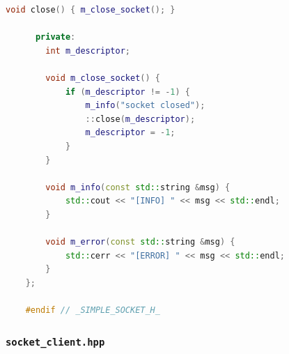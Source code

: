 \documentclass{article}
\begin{document}
\begin{lstlisting}[language=C++]
        void close() { m_close_socket(); }
    
      private:
        int m_descriptor;
    
        void m_close_socket() {
            if (m_descriptor != -1) {
                m_info("socket closed");
                ::close(m_descriptor);
                m_descriptor = -1;
            }
        }
    
        void m_info(const std::string &msg) {
            std::cout << "[INFO] " << msg << std::endl;
        }
    
        void m_error(const std::string &msg) {
            std::cerr << "[ERROR] " << msg << std::endl;
        }
    };
    
    #endif // _SIMPLE_SOCKET_H_    
\end{lstlisting}

\subsubsection{\texttt{socket\_client.hpp}}
\end{document}
